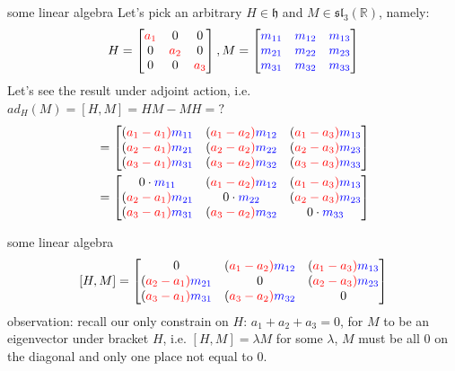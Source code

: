\documentclass{beamer}
\newcommand{\R}{\mathbb{R}}
\begin{document}
\begin{frame}{some linear algebra}
	Let's pick an arbitrary $H \in \mathfrak{h}$ and $M \in \mathfrak{sl}_3(\R)$, namely: \[
		H = \def\a{\color{red}a} \begin{bmatrix} \a_1 & 0 & 0 \\ 0 & \a_2 &0 \\ 0 &0 &\a_3 \end{bmatrix}, M = \def\m{\color{blue}m} \begin{bmatrix} \m_{11} & \m_{12} & \m_{13} \\ \m_{21} & \m_{22} & \m_{23} \\ \m_{31} & \m_{32} & \m_{33} \end{bmatrix} 
	\]
	Let's see the result under adjoint action, i.e. $ad_{H}(M) = [H,M] = HM-MH = ?$
	\begin{align*}
		[H,M] &= \def\a{\color{red}a} \def\m{\color{blue}m} \begin{bmatrix} (\a_1-\a_1)\m_{11} & (\a_1-\a_2)\m_{12} & (\a_1-\a_3)\m_{13} \\ (\a_2-\a_1)\m_{21} & (\a_2-\a_2)\m_{22} & (\a_2-\a_3)\m_{23} \\ (\a_3-\a_1)\m_{31} & (\a_3-\a_2)\m_{32} & (\a_3-\a_3)\m_{33} \end{bmatrix} \\
		      &=  \def\a{\color{red}a} \def\m{\color{blue}m} \begin{bmatrix} 0 \cdot \m_{11} & (\a_1-\a_2)\m_{12} & (\a_1-\a_3)\m_{13} \\ (\a_2-\a_1)\m_{21} & 0 \cdot \m_{22} & (\a_2-\a_3)\m_{23} \\ (\a_3-\a_1)\m_{31} & (\a_3-\a_2)\m_{32} & 0 \cdot \m_{33} \end{bmatrix} 
	\end{align*}
\end{frame}

\begin{frame}{some linear algebra}
	\[ [H,M] = \def\a{\color{red}a} \def\m{\color{blue}m} \begin{bmatrix} 0& (\a_1-\a_2)\m_{12} & (\a_1-\a_3)\m_{13} \\ (\a_2-\a_1)\m_{21} & 0& (\a_2-\a_3)\m_{23} \\ (\a_3-\a_1)\m_{31} & (\a_3-\a_2)\m_{32} & 0 \end{bmatrix} \] 
	\def\a{\color{red}a}
	observation: recall our only constrain on $H$:  $a_1+a_2+a_3=0$, for $M$ to be an eigenvector under bracket  $H$, i.e.  $[H,M] = \lambda M$ for some  $\lambda$,  $M$ must be all  $0$ on the diagonal and only one place not equal to  $0$. 


\end{frame}
\end{document}
